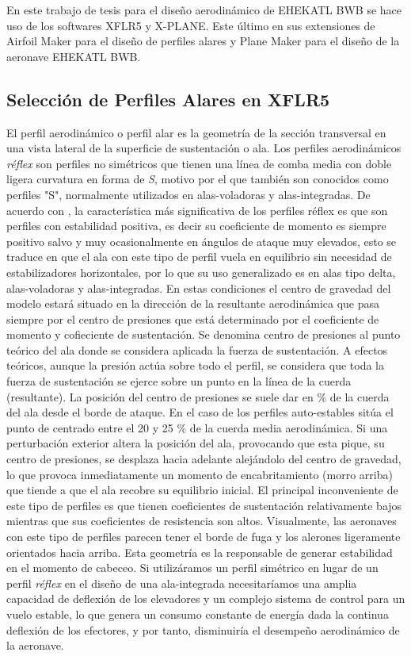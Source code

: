 En este trabajo de tesis para el diseño aerodinámico de EHEKATL BWB se hace uso de los softwares XFLR5 y X-PLANE. Este último en sus extensiones de Airfoil Maker para el diseño de perfiles alares y Plane Maker para el diseño de la aeronave EHEKATL BWB. 

\bigskip
\subsection{Selección de Perfiles Alares en XFLR5}
El perfil aerodinámico o perfil alar es la geometría de la sección transversal en una vista lateral de la superficie de sustentación o ala. Los perfiles aerodinámicos \textit{réflex} son perfiles no simétricos que tienen una línea de comba media con doble ligera curvatura en forma de \textit{S}, motivo por el que también son conocidos como perfiles "S", normalmente utilizados en alas-voladoras y alas-integradas. 
De acuerdo con \cite{gatovolante2015}, la característica más significativa de los perfiles réflex es que son perfiles con estabilidad positiva, es decir su coeficiente de momento es siempre positivo salvo y muy ocasionalmente en ángulos de ataque muy elevados, esto se traduce en que el ala con este tipo de perfil vuela en equilibrio sin necesidad de estabilizadores horizontales, por lo que su uso generalizado es en alas tipo delta, alas-voladoras y alas-integradas. 
%
En estas condiciones el centro de gravedad del modelo estará situado en la dirección de la resultante aerodinámica que pasa siempre por el centro de presiones que está determinado por el coeficiente de momento y cofieciente de sustentación. 
%
Se denomina centro de presiones al punto teórico del ala donde se considera aplicada la fuerza de sustentación. 
A efectos teóricos, aunque la presión actúa sobre todo el perfil, se considera que toda la fuerza de sustentación se ejerce sobre un punto en la línea de la cuerda (resultante). La posición del centro de presiones se suele dar en $\%$ de la cuerda del ala desde el borde de ataque. 
%
En el caso de los perfiles auto-estables sitúa el punto de centrado entre el 20 y 25 $\%$ de la cuerda media aerodinámica.
%
Si una perturbación exterior altera la posición del ala, provocando que esta pique, su centro de presiones, se desplaza hacia adelante alejándolo del centro de gravedad, lo que provoca inmediatamente un momento de encabritamiento (morro arriba) que tiende a que el ala recobre su equilibrio inicial. 
%
El principal inconveniente de este tipo de perfiles es que tienen coeficientes de sustentación relativamente bajos mientras que sus coeficientes de resistencia son altos. 
%
Visualmente, las aeronaves con este tipo de perfiles parecen tener el borde de fuga y los alerones ligeramente orientados hacia arriba. Esta geometría es la responsable de generar estabilidad en el momento de cabeceo.
Si utilizáramos un perfil simétrico en lugar de un perfil \textit{réflex} en el diseño de una ala-integrada necesitaríamos una amplia capacidad de deflexión de los elevadores y un complejo sistema de control para un vuelo estable, lo que genera un consumo constante de energía dada la continua deflexión de los efectores, y por tanto, disminuiría el desempeño aerodinámico de la aeronave. 

